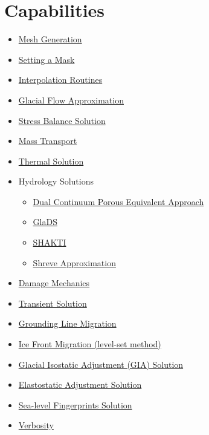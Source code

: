 
\section{Capabilities} \label{sec:using-issm-capabilities}

\begin{itemize}
	\item \hyperref[sec:using-issm-capabilities-mesh-generation]{Mesh Generation}
	\item \hyperref[sec:using-issm-capabilities-setmask]{Setting a Mask}
	\item \hyperref[sec:using-issm-capabilities-interpolation]{Interpolation Routines}
	\item \hyperref[sec:using-issm-capabilities-glacial-flow]{Glacial Flow Approximation}
	\item \hyperref[sec:using-issm-capabilities-stress-balance]{Stress Balance Solution}
	\item \hyperref[sec:using-issm-capabilities-mass-transport]{Mass Transport}
	\item \hyperref[sec:using-issm-capabilities-thermal]{Thermal Solution}
	\item Hydrology Solutions
	\begin{itemize}
		\item \hyperref[sec:using-issm-capabilities-hydrology-dc]{Dual Continuum Porous Equivalent Approach}
		\item \hyperref[sec:using-issm-capabilities-hydrology-glads]{GlaDS}
		\item \hyperref[sec:using-issm-capabilities-hydrology-shakti]{SHAKTI}
		\item \hyperref[sec:using-issm-capabilities-hydrology-shreve]{Shreve Approximation}
	\end{itemize}
	\item \hyperref[sec:using-issm-capabilities-damage]{Damage Mechanics}
	\item \hyperref[sec:using-issm-capabilities-transient]{Transient Solution}
	\item \hyperref[sec:using-issm-capabilities-grounding-lines]{Grounding Line Migration}
	\item \hyperref[sec:using-issm-capabilities-levelset]{Ice Front Migration (level-set method)}
	\item \hyperref[sec:using-issm-capabilities-gia]{Glacial Isostatic Adjustment (GIA) Solution}
	\item \hyperref[sec:using-issm-capabilities-esa]{Elastostatic Adjustment Solution}
	\item \hyperref[sec:using-issm-capabilities-slr]{Sea-level Fingerprints Solution}
	\item \hyperref[sec:using-issm-capabilities-verbosity]{Verbosity}
\end{itemize}
